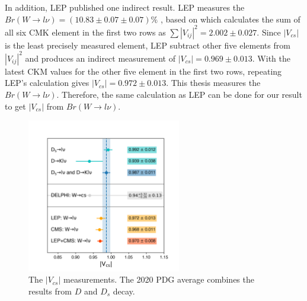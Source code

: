 In addition, LEP published one indirect result. LEP measures the $Br(W\to l \nu) = (10.83 \pm 0.07 \pm 0.07) \%$ \cite{Schael:2013ita}, based on which calculates the sum of all six CMK element in the first two rows as $\sum |V_{ij}|^2 = 2.002 \pm 0.027$. Since $|V_{cs}|$ is the least precisely measured element, LEP subtract other five elements from $|V_{ij}|^2 $ and produces an indirect measurement of $|V_{cs}|=0.969\pm 0.013$. With the latest CKM values for the other five element in the first two rows, repeating LEP's calculation gives $|V_{cs}|=0.972\pm 0.013$. This thesis measures the $Br(W\to l \nu)$. Therefore, the same calculation as LEP can be done for our result to get $|V_{cs}|$ from $Br(W\to l \nu)$.


 \begin{figure}
    \centering
    \includegraphics[width=0.6\textwidth]{chapters/RelatedWorks/sectionVcs/figures/vcs_world_average.png}
    \caption{The $|V_{cs}|$ measurements. The 2020 PDG average combines the results from $D$ and $D_s$ decay.}
    \label{fig:relatedWorks:vcs:measurements}
\end{figure}





% 
